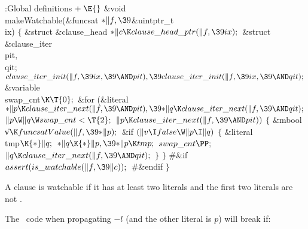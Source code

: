 \Y\B\4:Global definitions\X${}\mathrel+\E{}$\6
\&{void} \\{makeWatchable}(\&{funcsat} ${}{*}\|f,\39{}$\&{uintptr\_t} \\{ix})\1%
\1\2\2\6
${}\{{}$\1\6
\&{struct} \&{clause\_head} ${}{*}\|c\K\\{clause\_head\_ptr}(\|f,\39\\{ix});{}$%
\6
\&{struct} \&{clause\_iter} \\{pit}${},{}$ \\{qit};\7
${}\\{clause\_iter\_init}(\|f,\39\\{ix},\39{\AND}\\{pit}),\39\\{clause\_iter%
\_init}(\|f,\39\\{ix},\39{\AND}\\{qit});{}$\7
\&{variable} \\{swap\_cnt}${}\K\T{0};{}$\7
\&{for} (\&{literal} ${}{*}\|p\K\\{clause\_iter\_next}(\|f,\39{\AND}\\{pit}),%
\39{*}\|q\K\\{clause\_iter\_next}(\|f,\39{\AND}\\{qit});{}$ ${}\|p\W\|q\W%
\\{swap\_cnt}<\T{2};{}$ ${}\|p\K\\{clause\_iter\_next}(\|f,\39{\AND}%
\\{pit})){}$\5
${}\{{}$\1\6
\&{mbool} \|v${}\K\\{funcsatValue}(\|f,\39{*}\|p);{}$\7
\&{if} ${}(\|v\I\\{false}\W\|p\I\|q){}$\5
${}\{{}$\1\6
\&{literal} \\{tmp}${}\K{*}\|q;{}$\7
${}{*}\|q\K{*}\|p,\39{*}\|p\K\\{tmp};{}$\6
${}\\{swap\_cnt}\PP;{}$\6
${}\|q\K\\{clause\_iter\_next}(\|f,\39{\AND}\\{qit});{}$\6
\4${}\}{}$\2\6
\4${}\}{}$\2\6
\8\#\&{if} \6
${}\\{assert}(\\{is\_watchable}(\|f,\39\|c));{}$\6
\8\#\&{endif}\6
\4${}\}{}$\2\par
\fi

A clause is watchable if it has at least two literals and the first two
literals are not .

The \BCP\ code when propagating $-l$ (and the other literal is $p$) will break
if: \numberedlist


